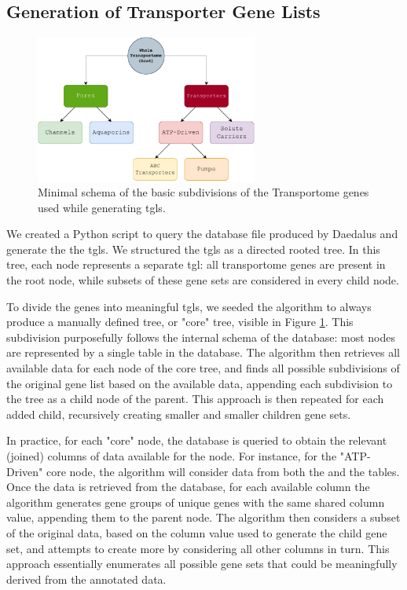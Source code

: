 \subsection{Generation of Transporter Gene Lists}

\begin{figure}
    \centering
    \includegraphics[width=0.65\textwidth]{resources/images/BasicTree.pdf}
    \caption{Minimal schema of the basic subdivisions of the Transportome genes used while generating \glspl{tgl}.}
    \label{fig:BasicTree}
\end{figure}

We created a Python script to query the database file produced by Daedalus and generate the the \glspl{tgl}. We structured the \glspl{tgl} as a directed rooted tree. In this tree, each node represents a separate \gls{tgl}: all transportome genes are present in the root node, while subsets of these gene sets are considered in every child node.

To divide the genes into meaningful \glspl{tgl}, we seeded the algorithm to always produce a manually defined tree, or "core" tree, visible in Figure \ref{fig:BasicTree}. This subdivision purposefully follows the internal schema of the database: most nodes are represented by a single table in the database. The algorithm then retrieves all available data for each node of the core tree, and finds all possible subdivisions of the original gene list based on the available data, appending each subdivision to the tree as a child node of the parent. This approach is then repeated for each added child, recursively creating smaller and smaller children gene sets.

In practice, for each "core" node, the database is queried to obtain the relevant (joined) columns of data available for the node. For instance, for the "ATP-Driven" core node, the algorithm will consider data from both the  and the  tables. Once the data is retrieved from the database, for each available column the algorithm generates gene groups of unique genes with the same shared column value, appending them to the parent node. The algorithm then considers a subset of the original data, based on the column value used to generate the child gene set, and attempts to create more by considering all other columns in turn. This approach essentially enumerates all possible gene sets that could be meaningfully derived from the annotated data. 

